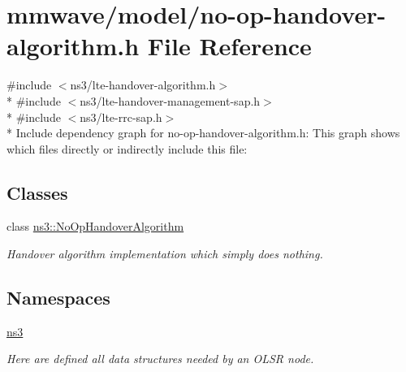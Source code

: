 \hypertarget{mmwave_2model_2no-op-handover-algorithm_8h}{}\section{mmwave/model/no-\/op-\/handover-\/algorithm.h File Reference}
\label{mmwave_2model_2no-op-handover-algorithm_8h}
{\ttfamily \#include $<$ns3/lte-\/handover-\/algorithm.\+h$>$}\\*
{\ttfamily \#include $<$ns3/lte-\/handover-\/management-\/sap.\+h$>$}\\*
{\ttfamily \#include $<$ns3/lte-\/rrc-\/sap.\+h$>$}\\*
Include dependency graph for no-\/op-\/handover-\/algorithm.h\+:
This graph shows which files directly or indirectly include this file\+:
\subsection*{Classes}
\begin{DoxyCompactItemize}
\item 
class \hyperlink{classns3_1_1NoOpHandoverAlgorithm}{ns3\+::\+No\+Op\+Handover\+Algorithm}
\begin{DoxyCompactList}\small\item\em Handover algorithm implementation which simply does nothing. \end{DoxyCompactList}\end{DoxyCompactItemize}
\subsection*{Namespaces}
\begin{DoxyCompactItemize}
\item 
 \hyperlink{namespacens3}{ns3}
\begin{DoxyCompactList}\small\item\em Here are defined all data structures needed by an O\+L\+SR node. \end{DoxyCompactList}\end{DoxyCompactItemize}
